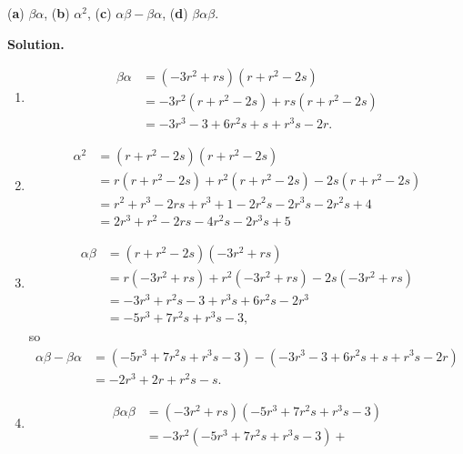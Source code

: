 \begin{enumerate}
                  (\textbf{a}) $\beta\alpha$, \quad (\textbf{b}) $\alpha^2$,
                  \quad (\textbf{c}) $\alpha\beta - \beta\alpha$, \quad
                  (\textbf{d}) $\beta\alpha\beta$.

      \textbf{Solution.}

      \begin{enumerate}
         \item \begin{align*}
                  \beta\alpha &= (-3r^2 + rs)(r + r^2 - 2s) \\
                     &= -3r^2(r + r^2 - 2s) + rs(r + r^2 - 2s) \\
                     &= -3r^3 - 3 + 6r^2s + s + r^3s - 2r.
               \end{align*}
         \item \begin{align*}
                  \alpha^2 &= (r + r^2 - 2s)(r + r^2 - 2s) \\
                     &= r(r + r^2 - 2s) + r^2(r + r^2 -2s) - 2s(r + r^2 - 2s) \\
                     &= r^2 + r^3 - 2rs + r^3 + 1 - 2r^2s - 2r^3s - 2r^2s + 4 \\
                     &= 2r^3 + r^2 - 2rs - 4r^2s - 2r^3s + 5
               \end{align*}
         \item \begin{align*}
                  \alpha\beta &= (r + r^2 - 2s)(-3r^2 + rs) \\
                     &= r(-3r^2 + rs) + r^2(-3r^2 + rs) - 2s(-3r^2 + rs) \\
                     &= -3r^3 + r^2s - 3 + r^3s + 6r^2s - 2r^3 \\
                     &= -5r^3 + 7r^2s + r^3s - 3,
               \end{align*}
               so
               \begin{align*}
                  \alpha\beta - \beta\alpha &= (-5r^3 + 7r^2s + r^3s - 3) -
                     (-3r^3 - 3 + 6r^2s + s + r^3s - 2r) \\
                     &= -2r^3 + 2r + r^2s - s.
               \end{align*}
         \item \begin{align*}
                  \beta\alpha\beta &= (-3r^2 + rs)(-5r^3 + 7r^2s + r^3s - 3) \\
                     &= -3r^2(-5r^3 + 7r^2s + r^3s - 3) +

\end{align*}
\end{enumerate}
\end{enumerate}
